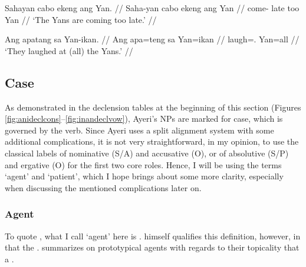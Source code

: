 \pex
\a\begingl
	\gla Sahayan cabo ekeng ang Yan. //
	\glb Saha-yan cabo ekeng ang Yan //
	\glc come-\TplM{} late too \Aarg{} Yan //
	\glft `The Yans are coming too late.' //
\endgl

\a\begingl
	\gla Ang apatang sa Yan-ikan. //
	\glb Ang apa=teng sa Yan=ikan //
	\glc \AgtT{} laugh=\TplF{}.\Aarg{} \Parg{} Yan=all //
	\glft `They laughed at (all) the Yans.' //
\endgl

\xe


\subsection{Case}
\label{subsec:case}

As demonstrated in the declension tables at the beginning of this section 
(Figures \ref{fig:anideclcons}–\ref{fig:inandeclvow}), Ayeri's NPs are marked 
for case, which is governed by the verb. Since Ayeri uses a split alignment 
system with some additional complications, it is not very straightforward, in my 
opinion, to use the classical labels of nominative (S/A) and accusative (O), or 
of absolutive (S/P) and ergative (O) for the first two core roles. Hence, I will 
be using the terms `agent' and `patient', which I hope brings about some more 
clarity, especially when discussing the mentioned complications later on.


\subsubsection{Agent}

To quote \citet{fillmore1968}, what I call `agent' here is  
. \citeauthor{fillmore1968} 
himself qualifies this definition, however, in that the . 
\citet{payne1997} summarizes on prototypical agents with regards to 
their topicality that a .

